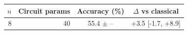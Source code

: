 \begin{tabular}{rrcc}
\toprule
$n$ & Circuit params & Accuracy (\%) & $\Delta$ vs classical \\
\midrule
8 & 40 & 55.4 $\pm$ -- & +3.5 [-1.7, +8.9] \\
\bottomrule
\end{tabular}